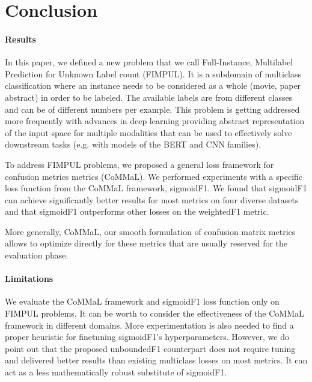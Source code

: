 
\section{Conclusion}
\label{sec:orged3d8a1}


\paragraph{Results}
In this paper, we defined a new problem that we call Full-Instance, Multilabel Prediction for Unknown Label count (FIMPUL). It is a subdomain of multiclass classification where an instance needs to be considered as a whole (movie, paper abstract) in order to be labeled. The available labels are from different classes and can be of different numbers per example. This problem is getting addressed more frequently with advances in deep learning providing abstract representation of the input space for multiple modalities that can be used to effectively solve downstream tasks (e.g. with models of the BERT and CNN families). 

To address FIMPUL problems, we proposed a general loss framework for confusion metrics metrics (CoMMaL). We performed  experiments with a specific loss function from the CoMMaL framework, sigmoidF1. We found that sigmoidF1 can achieve significantly better results for most metrics on four diverse datasets and that sigmoidF1 outperforms other losses on the weightedF1 metric.

More generally, CoMMaL, our smooth formulation of confusion matrix metrics allows to optimize directly for these metrics that are usually reserved for the evaluation phase. 

\paragraph{Limitations}
We evaluate the CoMMaL framework and sigmoidF1 loss function only on FIMPUL problems. It can be worth to consider the effectiveness of the CoMMaL framework in different domains. More experimentation is also needed to find a proper heuristic for finetuning sigmoidF1's hyperparameters. However, we do point out that the proposed unboundedF1 counterpart does not require tuning and delivered better results than existing multiclass losses on most metrics. It can act as a less mathematically robust substitute of sigmoidF1.

